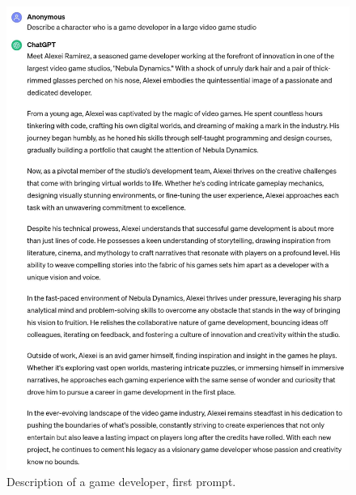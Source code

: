 \documentclass[a4paper]{article}
\begin{document}
\begin{figure}[H]
  \begin{center}
    \includegraphics[width=\textwidth]{task3/character_description_1.jpg}
    \caption{Description of a game developer, first prompt.}
    \label{fig:character description 1}
  \end{center}
\end{figure}
\end{document}
